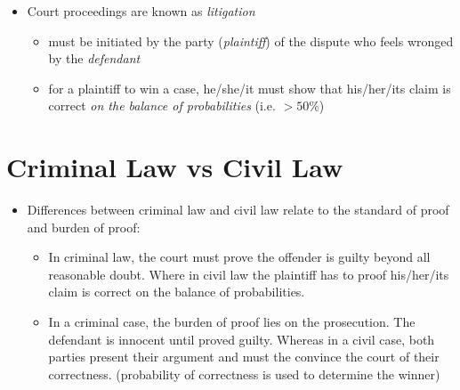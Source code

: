 \documentclass{article}
\begin{document}
\begin{itemize}
\item Court proceedings are known as \emph{litigation}
\begin{itemize}
\item must be initiated by the party (\emph{plaintiff}) of the dispute who feels wronged by the \emph{defendant}
\item for a plaintiff to win a case, he/she/it must show that his/her/its claim is correct \emph{on the balance of probabilities} (i.e. $> 50\%$)
\end{itemize}
\end{itemize}



\section{Criminal Law vs Civil Law}
\begin{itemize}
\item Differences between criminal law and civil law relate to the standard of proof and burden of proof:
\begin{itemize}
\item In criminal law, the court must prove the offender is guilty beyond all reasonable doubt. Where in civil law the plaintiff has to proof his/her/its claim is correct on the balance of probabilities.
\item In a criminal case, the burden of proof lies on the prosecution. The defendant is innocent until proved guilty. Whereas in a civil case, both parties present their argument and must the convince the court of their correctness. (probability of correctness is used to determine the winner)
\end{itemize}
\end{itemize}
\end{document}
